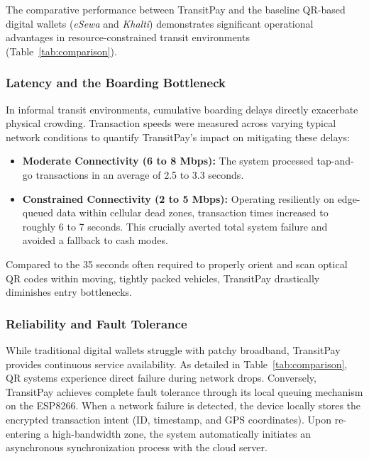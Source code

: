 \documentclass[manuscript,review,anonymous]{acmart}
\begin{document}
The comparative performance between TransitPay and the baseline QR-based digital wallets (\textit{eSewa} and \textit{Khalti}) demonstrates significant operational advantages in resource-constrained transit environments (Table~\ref{tab:comparison}).

\subsubsection{Latency and the Boarding Bottleneck}
In informal transit environments, cumulative boarding delays directly exacerbate physical crowding. Transaction speeds were measured across varying typical network conditions to quantify TransitPay's impact on mitigating these delays:
\begin{itemize}
\item \textbf{Moderate Connectivity (6 to 8 Mbps):} The system processed tap-and-go transactions in an average of 2.5 to 3.3 seconds.
\item \textbf{Constrained Connectivity (2 to 5 Mbps):} Operating resiliently on edge-queued data within cellular dead zones, transaction times increased to roughly 6 to 7 seconds. This crucially averted total system failure and avoided a fallback to cash modes.
\end{itemize}
Compared to the 35 seconds often required to properly orient and scan optical QR codes within moving, tightly packed vehicles, TransitPay drastically diminishes entry bottlenecks.

\subsubsection{Reliability and Fault Tolerance}
While traditional digital wallets struggle with patchy broadband, TransitPay provides continuous service availability. As detailed in Table~\ref{tab:comparison}, QR systems experience direct failure during network drops. Conversely, TransitPay achieves complete fault tolerance through its local queuing mechanism on the ESP8266. When a network failure is detected, the device locally stores the encrypted transaction intent (ID, timestamp, and GPS coordinates). Upon re-entering a high-bandwidth zone, the system automatically initiates an asynchronous synchronization process with the cloud server.
\end{document}
